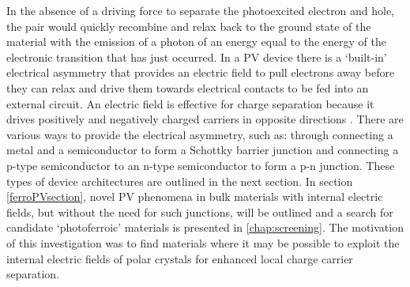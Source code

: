 \documentclass[11pt, twoside]{report}
\begin{document}
In the absence of a driving force to separate the photoexcited electron and hole, the pair would quickly recombine and relax back to the ground state of the material with the emission of a photon of an energy equal to the energy of the electronic transition that has just occurred. In a PV device there is a `built-in' electrical asymmetry that provides an electric field to pull electrons away before they can relax and drive them towards electrical contacts to be fed into an external circuit. An electric field is effective for charge separation because it drives positively and negatively charged carriers in opposite directions \cite{Nelson5}. There are various ways to provide the electrical asymmetry, such as: through connecting a metal and a semiconductor to form a Schottky barrier junction and connecting a p-type semiconductor to an n-type semiconductor to form a p-n junction. These types of device architectures are outlined in the next section. In section \ref{ferroPVsection}, novel PV phenomena in bulk materials with internal electric fields, but without the need for such junctions, will be outlined and a search for candidate `photoferroic' materials is presented in \autoref{chap:screening}. The motivation of this investigation was to find materials where it may be possible to exploit the internal electric fields of polar crystals for enhanced local charge carrier separation.
\end{document}
